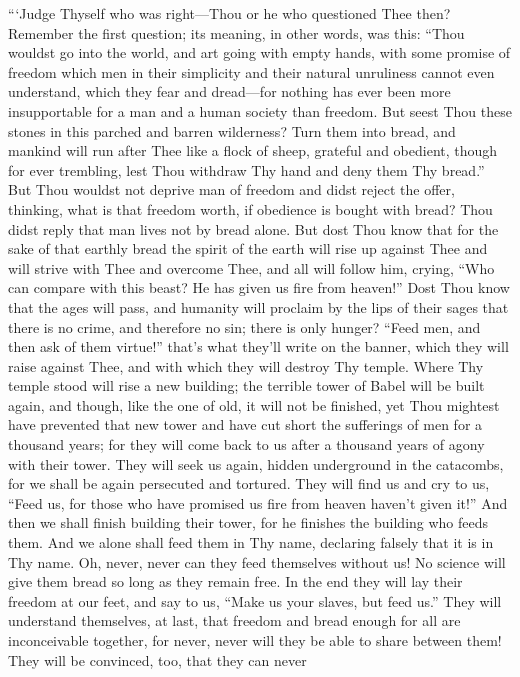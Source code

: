 ```Judge Thyself who was right---Thou or he who questioned Thee then?
Remember the first question; its meaning, in other words, was this:
``Thou wouldst go into the world, and art going with empty hands, with
some promise of freedom which men in their simplicity and their
natural unruliness cannot even understand, which they fear and
dread---for nothing has ever been more insupportable for a man and a
human society than freedom. But seest Thou these stones in this
parched and barren wilderness? Turn them into bread, and mankind will
run after Thee like a flock of sheep, grateful and obedient, though
for ever trembling, lest Thou withdraw Thy hand and deny them Thy
bread.'' But Thou wouldst not deprive man of freedom and didst reject
the offer, thinking, what is that freedom worth, if obedience is
bought with bread? Thou didst reply that man lives not by bread alone.
But dost Thou know that for the sake of that earthly bread the spirit
of the earth will rise up against Thee and will strive with Thee and
overcome Thee, and all will follow him, crying, ``Who can compare with
this beast? He has given us fire from heaven!'' Dost Thou know that
the ages will pass, and humanity will proclaim by the lips of their
sages that there is no crime, and therefore no sin; there is only
hunger? ``Feed men, and then ask of them virtue!'' that's what they'll
write on the banner, which they will raise against Thee, and with
which they will destroy Thy temple. Where Thy temple stood will rise a
new building; the terrible tower of Babel will be built again, and
though, like the one of old, it will not be finished, yet Thou
mightest have prevented that new tower and have cut short the
sufferings of men for a thousand years; for they will come back to us
after a thousand years of agony with their tower. They will seek us
again, hidden underground in the catacombs, for we shall be again
persecuted and tortured. They will find us and cry to us, ``Feed us,
for those who have promised us fire from heaven haven't given it!''
And then we shall finish building their tower, for he finishes the
building who feeds them. And we alone shall feed them in Thy name,
declaring  falsely that it is in Thy name. Oh, never, never
can they feed themselves without us! No science will give them bread
so long as they remain free. In the end they will lay their freedom at
our feet, and say to us, ``Make us your slaves, but feed us.'' They
will understand themselves, at last, that freedom and bread enough for
all are inconceivable together, for never, never will they be able to
share between them! They will be convinced, too, that they can never
